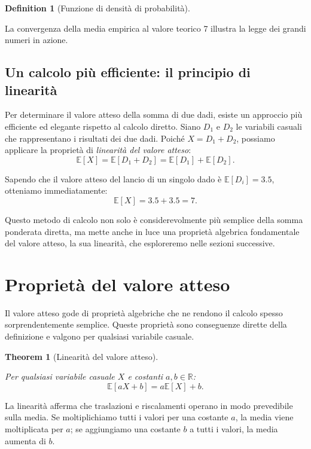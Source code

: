 \documentclass[
  letterpaper,
  DIV=11,
  numbers=noendperiod,
  oneside]{scrreprt}
\theoremstyle{definition}
\theoremstyle{plain}
\newtheorem{theorem}{Theorem}[chapter]
\theoremstyle{definition}
\newtheorem{definition}{Definition}[chapter]
\theoremstyle{remark}
\begin{document}
\begin{definition}[Funzione di densità di
probabilità]
\begin{tcolorbox}
La convergenza della media empirica al valore teorico 7 illustra la
legge dei grandi numeri in azione.

\end{tcolorbox}

\subsection{Un calcolo più efficiente: il principio di
linearità}\label{un-calcolo-piuxf9-efficiente-il-principio-di-linearituxe0}

Per determinare il valore atteso della somma di due dadi, esiste un
approccio più efficiente ed elegante rispetto al calcolo diretto. Siano
\(D_1\) e \(D_2\) le variabili casuali che rappresentano i risultati dei
due dadi. Poiché \(X = D_1 + D_2\), possiamo applicare la proprietà di
\emph{linearità del valore atteso}: \[
\mathbb{E}[X] = \mathbb{E}[D_1 + D_2] = \mathbb{E}[D_1] + \mathbb{E}[D_2].
\]

Sapendo che il valore atteso del lancio di un singolo dado è
\(\mathbb{E}[D_i] = 3.5\), otteniamo immediatamente: \[
\mathbb{E}[X] = 3.5 + 3.5 = 7.
\]

Questo metodo di calcolo non solo è considerevolmente più semplice della
somma ponderata diretta, ma mette anche in luce una proprietà algebrica
fondamentale del valore atteso, la sua linearità, che esploreremo nelle
sezioni successive.

\section{Proprietà del valore
atteso}\label{proprietuxe0-del-valore-atteso}

Il valore atteso gode di proprietà algebriche che ne rendono il calcolo
spesso sorprendentemente semplice. Queste proprietà sono conseguenze
dirette della definizione e valgono per qualsiasi variabile casuale.

\begin{theorem}[Linearità del valore
atteso]\protect\hypertarget{thm-expected-value-linearity}{}\label{thm-expected-value-linearity}

Per qualsiasi variabile casuale \(X\) e costanti
\(a, b \in \mathbb{R}\): \[
\mathbb{E}[aX + b] = a\mathbb{E}[X] + b.
\]

\end{theorem}

La linearità afferma che traslazioni e riscalamenti operano in modo
prevedibile sulla media. Se moltiplichiamo tutti i valori per una
costante \(a\), la media viene moltiplicata per \(a\); se aggiungiamo
una costante \(b\) a tutti i valori, la media aumenta di \(b\).


\end{definition}
\end{document}
